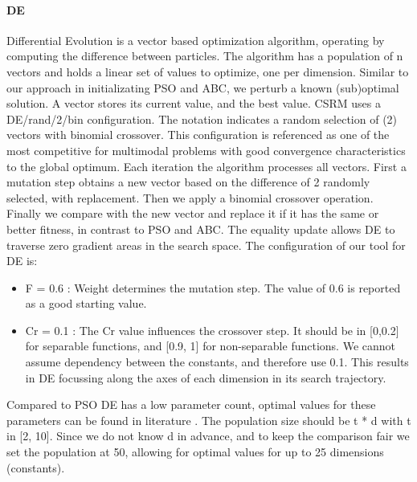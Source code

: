 \paragraph{DE}
Differential Evolution is a vector based optimization algorithm, operating by computing the difference between particles. The algorithm has a population of n vectors and holds a linear set of values to optimize, one per dimension. Similar to our approach in initializating PSO and ABC, we perturb a known (sub)optimal solution. A vector stores its current value, and the best value. CSRM uses a DE/rand/2/bin configuration. The notation indicates a random selection of (2) vectors with binomial crossover. This configuration is referenced \cite{DE} as one of the most competitive for multimodal problems with good convergence characteristics to the global optimum. Each iteration the algorithm processes all vectors. First a mutation step obtains a new vector based on the difference of 2 randomly selected, with replacement. Then we apply a binomial crossover operation. Finally we compare with the new vector and replace it if it has the same or better fitness, in contrast to PSO and ABC. The equality update allows DE to traverse zero gradient areas in the search space.
The configuration of our tool for DE is:
\begin{itemize}
\item F = 0.6 : Weight determines the mutation step. The value of 0.6 is reported as a good starting value\citep{DESurveyLatest}. 
\item Cr = 0.1 : The Cr value influences the crossover step. It should be in [0,0.2] for separable functions, and [0.9, 1] for non-separable functions. We cannot assume dependency between the constants, and therefore use 0.1. This results in DE focussing along the axes of each dimension in its search trajectory. 
\end{itemize}
Compared to PSO DE has a low parameter count, optimal values for these parameters can be found in literature \cite{DESurveyLatest}. The population size should be t * d with t in [2, 10]. Since we do not know d in advance, and to keep the comparison fair we set the population at 50, allowing for optimal values for up to 25 dimensions (constants).